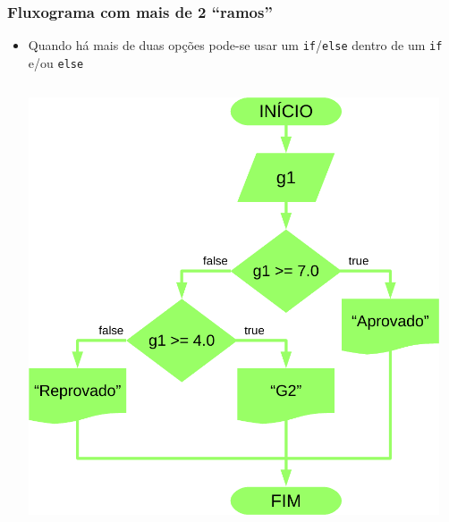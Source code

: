 \documentclass[xcolor={dvipsnames,table},aspectratio=169]{beamer}
\begin{document}
\begin{frame}[fragile]\frametitle{Fluxograma com mais de 2 ``ramos''}
\begin{itemize}
	\item Quando há mais de duas opções pode-se usar um \texttt{if}/\texttt{else} dentro de um \texttt{if} e/ou \texttt{else}
\begin{columns}
\begin{column}{0.4\textwidth}
	\begin{center}
	\includegraphics[height=0.6\paperheight]{pucrs-ep-fprog-unidade_03-decisoes-laminas-fluxograma_if_else_aninhado.png}
	\end{center}
\end{column}
\begin{column}{0.6\textwidth}
	\tiny{\inputminted[bgcolor=cyan!10]{java}{src/AprovadoG2OuReprovado.java}}
\end{column}
\end{columns}
\end{itemize}
\end{frame}
\end{document}
